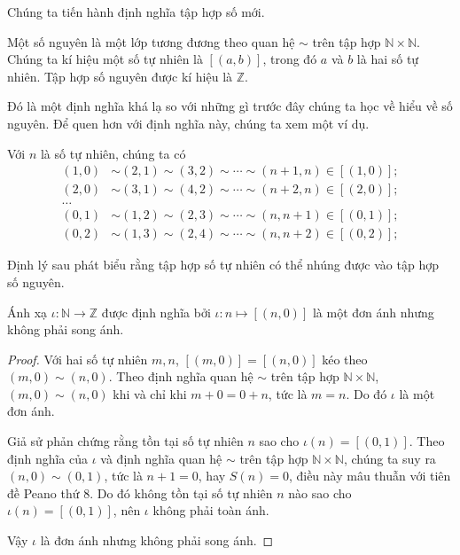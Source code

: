 Chúng ta tiến hành định nghĩa tập hợp số mới.
\begin{definition}
	Một số nguyên là một lớp tương đương theo quan hệ $\sim$ trên tập hợp $\mathbb{N}\times\mathbb{N}$. Chúng ta kí hiệu một số tự nhiên là $[(a, b)]$, trong đó $a$ và $b$ là hai số tự nhiên. Tập hợp số nguyên được kí hiệu là $\mathbb{Z}$.
\end{definition}

Đó là một định nghĩa khá lạ so với những gì trước đây chúng ta học về hiểu về số nguyên. Để quen hơn với định nghĩa này, chúng ta xem một ví dụ.
\begin{example}
	Với $n$ là số tự nhiên, chúng ta có
	\begin{align*}
		(1, 0) & \sim (2, 1) \sim (3, 2) \sim \cdots \sim (n+1, n) \in [(1, 0)]; \\
		(2, 0) & \sim (3, 1) \sim (4, 2) \sim \cdots \sim (n+2, n) \in [(2, 0)]; \\
		\ldots                                                                   \\
		(0, 1) & \sim (1, 2) \sim (2, 3) \sim \cdots \sim (n, n+1) \in [(0, 1)]; \\
		(0, 2) & \sim (1, 3) \sim (2, 4) \sim \cdots \sim (n, n+2) \in [(0, 2)];
	\end{align*}
\end{example}

Định lý sau phát biểu rằng tập hợp số tự nhiên có thể nhúng được vào tập hợp số nguyên.
\begin{theorem}\label{theorem:embed-N-into-Z}
	Ánh xạ $\iota: \mathbb{N}\to \mathbb{Z}$ được định nghĩa bởi $\iota: n\mapsto [(n, 0)]$ là một đơn ánh nhưng không phải song ánh.
\end{theorem}

\begin{proof}
	Với hai số tự nhiên $m, n$, $[(m, 0)] = [(n, 0)]$ kéo theo $(m, 0)\sim (n, 0)$. Theo định nghĩa quan hệ $\sim$ trên tập hợp $\mathbb{N}\times\mathbb{N}$, $(m, 0)\sim (n, 0)$ khi và chỉ khi $m + 0 = 0 + n$, tức là $m = n$. Do đó $\iota$ là một đơn ánh.

	Giả sử phản chứng rằng tồn tại số tự nhiên $n$ sao cho $\iota(n) = [(0, 1)]$. Theo định nghĩa của $\iota$ và định nghĩa quan hệ $\sim$ trên tập hợp $\mathbb{N}\times\mathbb{N}$, chúng ta suy ra $(n, 0)\sim (0, 1)$, tức là $n + 1 = 0$, hay $S(n) = 0$, điều này mâu thuẫn với tiên đề Peano thứ 8. Do đó không tồn tại số tự nhiên $n$ nào sao cho $\iota(n) = [(0, 1)]$, nên $\iota$ không phải toàn ánh.

	Vậy $\iota$ là đơn ánh nhưng không phải song ánh.
\end{proof}

